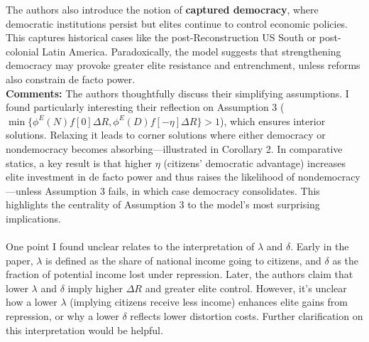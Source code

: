 \documentclass[10.5pt]{article}    %
\begin{document}
The authors also introduce the notion of \textbf{captured democracy}, where democratic institutions persist but elites continue to control economic policies. This captures historical cases like the post-Reconstruction US South or post-colonial Latin America. Paradoxically, the model suggests that strengthening democracy may provoke greater elite resistance and entrenchment, unless reforms also constrain de facto power.\\

\textbf{Comments:} The authors thoughtfully discuss their simplifying assumptions. I found particularly interesting their reflection on Assumption 3 ($\min \{\phi^E(N)f[0]\Delta R, \phi^E(D)f[-\eta]\Delta R \} > 1$), which ensures interior solutions. Relaxing it leads to corner solutions where either democracy or nondemocracy becomes absorbing—illustrated in Corollary 2. In comparative statics, a key result is that higher $\eta$ (citizens' democratic advantage) increases elite investment in de facto power and thus raises the likelihood of nondemocracy—unless Assumption 3 fails, in which case democracy consolidates. This highlights the centrality of Assumption 3 to the model's most surprising implications.\\
\\
One point I found unclear relates to the interpretation of $\lambda$ and $\delta$. Early in the paper, $\lambda$ is defined as the share of national income going to citizens, and $\delta$ as the fraction of potential income lost under repression. Later, the authors claim that lower $\lambda$ and $\delta$ imply higher $\Delta R$ and greater elite control. However, it's unclear how a lower $\lambda$ (implying citizens receive less income) enhances elite gains from repression, or why a lower $\delta$ reflects lower distortion costs. Further clarification on this interpretation would be helpful.
\end{document}
